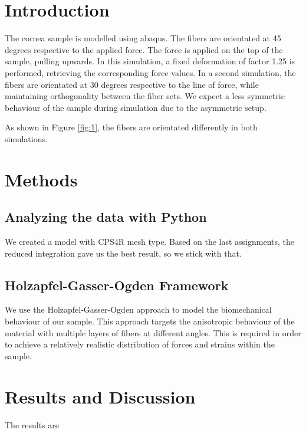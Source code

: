 \documentclass[12pt]{article}
\begin{document}
\tableofcontents
\pagebreak
\section{Introduction}

The cornea sample is modelled using abaqus. The fibers are orientated at 45 degrees respective to
the applied force. The force is applied on the top of the sample, pulling upwards.
In this simulation, a fixed deformation of factor 1.25 is performed, retrieving the corresponding 
force values.
In a second simulation, the fibers are orientated  at 30 degrees respective to the line of force,
while maintaining orthogonality between the fiber sets. We expect a less symmetric behaviour of the sample
during simulation due to the asymmetric setup.


\noindent As shown in Figure \ref{fig:1}, the fibers are orientated differently in both simulations.

\newpage
\section{Methods}

\subsection{Analyzing the data with Python}

We created a model with CPS4R mesh type. Based on the last assignments, the reduced integration
gave us the best result, so we stick with that.

\subsection{Holzapfel-Gasser-Ogden Framework}

We use the Holzapfel-Gasser-Ogden approach to model the biomechanical behaviour of our
sample. This approach targets the anisotropic behaviour of the material with multiple
layers of fibers at different angles. This is required in order to achieve a relatively
realistic distribution of forces and strains within the sample.\cite{holzapfel}




\pagebreak
\section{Results and Discussion}

The results are 
\end{document}

